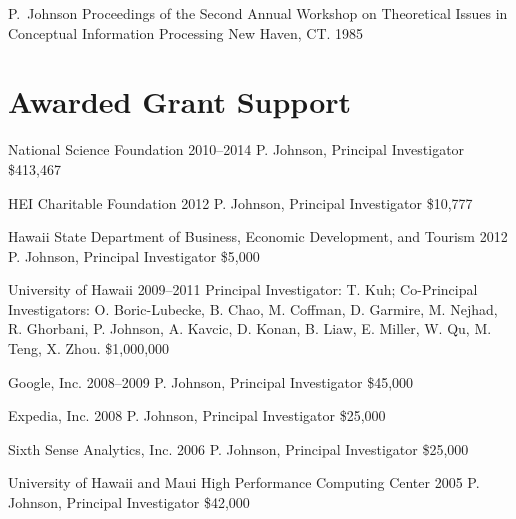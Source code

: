\documentclass[11pt,letterpaper,sans]{moderncv} %
\begin{document}
          {P.~Johnson}
          {Proceedings of the Second Annual Workshop on Theoretical Issues in Conceptual Information Processing}
          {New Haven, CT.  1985}

\section{Awarded Grant Support}

        {National Science Foundation} %
        {2010--2014} %
        {P. Johnson, Principal Investigator}  %
        {\$413,467} %

            {HEI Charitable Foundation}
            {2012}
            {P. Johnson, Principal Investigator} 
            {\$10,777}

            {Hawaii State Department of Business, Economic Development, and Tourism} %
            {2012} %
            {P. Johnson, Principal Investigator}  %
            {\$5,000} %

        {University of Hawaii} %
        {2009--2011} %
        {Principal Investigator: T. Kuh; Co-Principal Investigators:  O. Boric-Lubecke, B. Chao, M. Coffman, D. Garmire, M. Nejhad, R. Ghorbani, P. Johnson, A. Kavcic, D. Konan, B. Liaw, E. Miller, W. Qu, M. Teng, X. Zhou.}  %
        {\$1,000,000} %

        {Google, Inc.} %
        {2008--2009} %
        {P. Johnson, Principal Investigator}  %
        {\$45,000} %

        {Expedia, Inc.} %
        {2008} %
        {P. Johnson, Principal Investigator}  %
        {\$25,000} %

        {Sixth Sense Analytics, Inc.} %
        {2006} %
        {P. Johnson, Principal Investigator}  %
        {\$25,000} %

        {University of Hawaii and Maui High Performance Computing Center} %
        {2005} %
        {P. Johnson, Principal Investigator}  %
        {\$42,000} %
\end{document}
